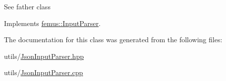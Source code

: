 See father class 

Implements \mbox{\hyperlink{classfemus_1_1_input_parser_aa9a108efd3c78de43435a43c229a21e5}{femus\+::\+Input\+Parser}}.



The documentation for this class was generated from the following files\+:\begin{DoxyCompactItemize}
\item 
utils/\mbox{\hyperlink{_json_input_parser_8hpp}{Json\+Input\+Parser.\+hpp}}\item 
utils/\mbox{\hyperlink{_json_input_parser_8cpp}{Json\+Input\+Parser.\+cpp}}\end{DoxyCompactItemize}
